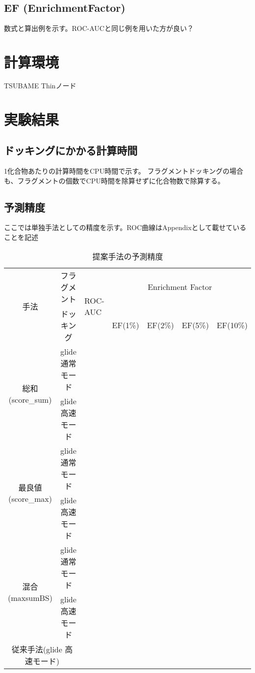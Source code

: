 \subsection{EF (EnrichmentFactor)}
数式と算出例を示す。ROC-AUCと同じ例を用いた方が良い？
\section{計算環境}
TSUBAME Thinノード
\section{実験結果}
\subsection{ドッキングにかかる計算時間}
1化合物あたりの計算時間をCPU時間で示す。
フラグメントドッキングの場合も、フラグメントの個数でCPU時間を除算せずに化合物数で除算する。
\subsection{予測精度}
ここでは単独手法としての精度を示す。ROC曲線はAppendixとして載せていることを記述

\begin{table}[htb] \centering
	\caption{提案手法の予測精度}
	\label{tb:filtering_accuracy}
	\begin{tabular}{c|c|lllll|}
	\multirow{2}{*}{手法}				&フラグメント		&\multirow{2}{*}{ROC-AUC}	&\multicolumn{4}{c}{Enrichment Factor}	\\
									&ドッキング		&						&EF(1\%)	&EF(2\%)	&EF(5\%)	&EF(10\%)	\\ \hline
	\multirow{2}{*}{総和(score\_sum)}		&glide 通常モード	&						&		&		&		&			\\
									&glide 高速モード	&						&		&		&		&			\\
	\multirow{2}{*}{最良値(score\_max)}	&glide 通常モード	&						&		&		&		&			\\
									&glide 高速モード	&						&		&		&		&			\\
	\multirow{2}{*}{混合(maxsumBS)}		&glide 通常モード	&						&		&		&		&			\\
									&glide 高速モード	&						&		&		&		&			\\ \hline
	\multicolumn{2}{c|}{従来手法(glide 高速モード)}			&						&		&		&		&			\\ \hline
	\end{tabular}
\end{table}

